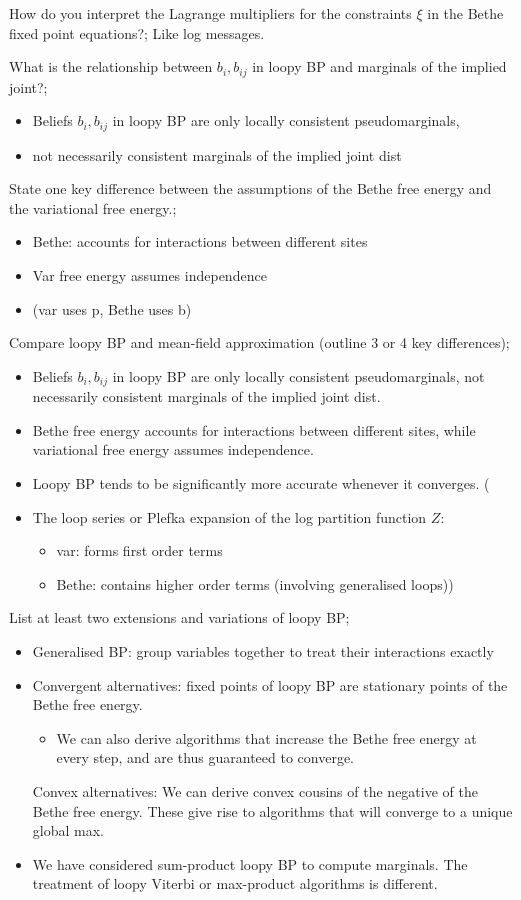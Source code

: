 \documentclass{article}
\begin{document}
How do you interpret the Lagrange multipliers for the constraints $\xi$ in the Bethe fixed point equations?; Like log messages.

What is the relationship between $b_i, b_{ij}$ in loopy BP and marginals of the implied joint?; \begin{itemize} \item Beliefs $b_i, b_{ij}$ in loopy BP are only locally consistent pseudomarginals, \item not necessarily consistent marginals of the implied joint dist \end{itemize}

State one key difference between the assumptions of the Bethe free energy and the variational free energy.; \begin{itemize} \item Bethe: accounts for interactions between different sites \item Var free energy assumes independence \item (var uses p, Bethe uses b) \end{itemize}

Compare loopy BP and mean-field approximation (outline 3 or 4 key differences); \begin{itemize} \item Beliefs $b_i, b_{ij}$ in loopy BP are only locally consistent pseudomarginals, not necessarily consistent marginals of the implied joint dist. \item Bethe free energy accounts for interactions between different sites, while variational free energy assumes independence. \item Loopy BP tends to be significantly more accurate whenever it converges. (\item The loop series or Plefka expansion of the log partition function $Z$: \begin{itemize} \item var: forms first order terms \item Bethe: contains higher order terms (involving generalised loops)) \end{itemize} \end{itemize}

List at least two extensions and variations of loopy BP; \begin{itemize} \item Generalised BP: group variables together to treat their interactions exactly \item Convergent alternatives: fixed points of loopy BP are stationary points of the Bethe free energy. \begin{itemize} \item We can also derive algorithms that increase the Bethe free energy at every step, and are thus guaranteed to converge. \end{itemize} \time Convex alternatives: We can derive convex cousins of the negative of the Bethe free energy. These give rise to algorithms that will converge to a unique global max. \item We have considered sum-product loopy BP to compute marginals. The treatment of loopy Viterbi or max-product algorithms is different. \end{itemize}
\end{document}
